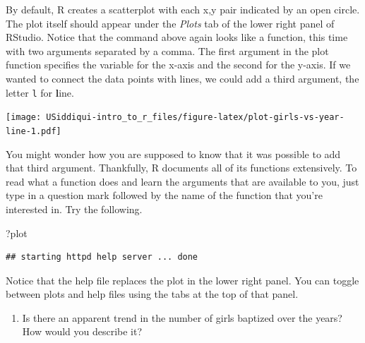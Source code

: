 \documentclass[
]{article}
\newenvironment{Shaded}{\begin{snugshade}}{\end{snugshade}}
\newcommand{\DataTypeTok}[1]{\textcolor[rgb]{0.13,0.29,0.53}{#1}}
\newcommand{\KeywordTok}[1]{\textcolor[rgb]{0.13,0.29,0.53}{\textbf{#1}}}
\newcommand{\NormalTok}[1]{#1}
\newcommand{\OperatorTok}[1]{\textcolor[rgb]{0.81,0.36,0.00}{\textbf{#1}}}
\newcommand{\StringTok}[1]{\textcolor[rgb]{0.31,0.60,0.02}{#1}}
\providecommand{\tightlist}{%
  \setlength{\itemsep}{0pt}\setlength{\parskip}{0pt}}
\begin{document}
By default, R creates a scatterplot with each x,y pair indicated by an
open circle. The plot itself should appear under the \emph{Plots} tab of
the lower right panel of RStudio. Notice that the command above again
looks like a function, this time with two arguments separated by a
comma. The first argument in the plot function specifies the variable
for the x-axis and the second for the y-axis. If we wanted to connect
the data points with lines, we could add a third argument, the letter
\texttt{l} for \textbf{l}ine.

\begin{Shaded}
\end{Shaded}

\texttt{[image: USiddiqui-intro\_to\_r\_files/figure-latex/plot-girls-vs-year-line-1.pdf]}

You might wonder how you are supposed to know that it was possible to
add that third argument. Thankfully, R documents all of its functions
extensively. To read what a function does and learn the arguments that
are available to you, just type in a question mark followed by the name
of the function that you're interested in. Try the following.

\begin{Shaded}
\begin{Highlighting}[]
\NormalTok{?plot}
\end{Highlighting}
\end{Shaded}

\begin{verbatim}
## starting httpd help server ... done
\end{verbatim}

Notice that the help file replaces the plot in the lower right panel.
You can toggle between plots and help files using the tabs at the top of
that panel.

\begin{enumerate}
\def\labelenumi{\arabic{enumi}.}
\setcounter{enumi}{1}
\tightlist
\item
  Is there an apparent trend in the number of girls baptized over the
  years?\\
  How would you describe it?
\end{enumerate}
\end{document}
